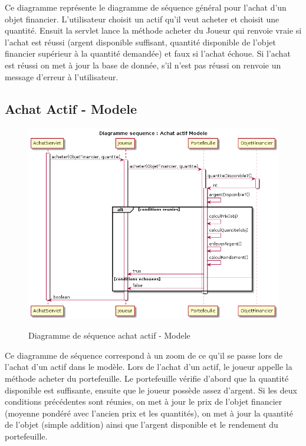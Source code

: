 Ce diagramme représente le diagramme de séquence général pour l'achat d'un objet financier. L'utilisateur choisit un actif qu'il veut acheter et choisit une quantité. Ensuit la servlet lance la méthode acheter du Joueur qui renvoie vraie si l'achat est réussi (argent disponible suffisant, quantité disponible de l'objet financier supérieur à la quantité demandée) et faux si l'achat échoue. Si l'achat est réussi on met à jour la base de donnée, s'il n'est pas réussi on renvoie un message d'erreur à l'utilisateur. 

\subsection{Achat Actif - Modele}
\begin{figure}[H]
  \center
  \includegraphics[scale=0.25]{../graph/DiagrammeSequenceAchatActifModele.png} \\
  \caption{Diagramme de séquence achat actif - Modele}
\end{figure}

Ce diagramme de séquence correspond à un zoom de ce qu'il se passe lors de l'achat d'un actif dans le modèle. Lors de l'achat d'un actif, le joueur appelle la méthode acheter du portefeuille. Le portefeuille vérifie d'abord que la quantité disponible est suffisante, ensuite que le joueur possède assez d'argent. Si les deux conditions précédentes sont réunies, on met à jour le prix de l'objet financier (moyenne pondéré avec l'ancien prix et les quantités), on met à jour la quantité de l'objet (simple addition) ainsi que l'argent disponible et le rendement du portefeuille. 

